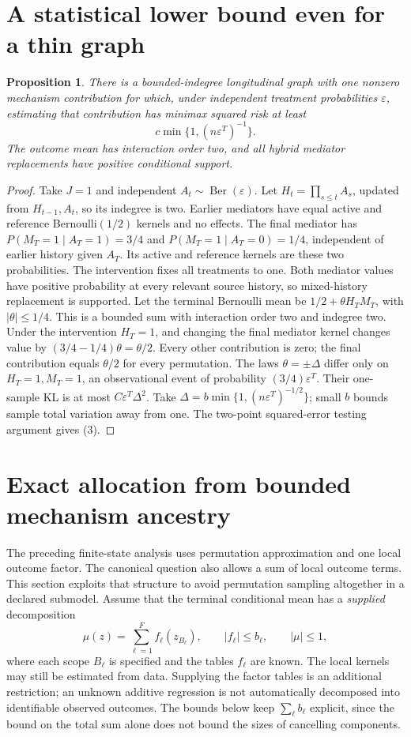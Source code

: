 \documentclass[11pt]{article}
\newtheorem{proposition}[theorem]{Proposition}
\theoremstyle{definition}
\begin{document}
\section*{A statistical lower bound even for a thin graph}
\begin{proposition}
There is a bounded-indegree longitudinal graph with one nonzero mechanism
contribution for which, under independent treatment probabilities
$\varepsilon$, estimating that contribution has minimax squared risk at least
\[
 c\min\{1,(n\varepsilon^T)^{-1}\}.                     \tag{3}
\]
The outcome mean has interaction order two, and all hybrid mediator
replacements have positive conditional support.
\end{proposition}
\begin{proof}
Take $J=1$ and independent $A_t\sim\operatorname{Ber}(\varepsilon)$.
Let $H_t=\prod_{s\le t}A_s$, updated from $H_{t-1},A_t$, so its indegree
is two. Earlier mediators have equal active and reference Bernoulli$(1/2)$
kernels and no effects. The final mediator has
$P(M_T=1\mid A_T=1)=3/4$ and
$P(M_T=1\mid A_T=0)=1/4$, independent of earlier history given $A_T$.
Its active and reference kernels are these two probabilities.
The intervention fixes all treatments to one. Both mediator values have
positive probability at every relevant source history, so mixed-history
replacement is supported. Let the terminal Bernoulli mean be
$1/2+\theta H_T M_T$, with $|\theta|\le1/4$.
This is a bounded sum with interaction order two and indegree two.
Under the intervention $H_T=1$, and changing the final mediator kernel
changes value by $(3/4-1/4)\theta=\theta/2$.
Every other contribution is zero; the final contribution equals $\theta/2$
for every permutation.
The laws $\theta=\pm\Delta$ differ only on $H_T=1,M_T=1$,
an observational event of probability $(3/4)\varepsilon^T$.
Their one-sample KL is at most $C\varepsilon^T\Delta^2$.
Take $\Delta=b\min\{1,(n\varepsilon^T)^{-1/2}\}$; small $b$ bounds
sample total variation away from one. The two-point squared-error testing
argument gives (3).
\end{proof}

\section*{Exact allocation from bounded mechanism ancestry}
The preceding finite-state analysis uses permutation approximation and one
local outcome factor. The canonical question also allows a sum of local
outcome terms. This section exploits that structure to avoid permutation
sampling altogether in a declared submodel. Assume that the terminal
conditional mean has a \emph{supplied} decomposition
\[
 \mu(z)=\sum_{\ell=1}^F f_\ell(z_{B_\ell}),\qquad
 |f_\ell|\le b_\ell,\qquad |\mu|\le1,                 \tag{4}
\]
where each scope $B_\ell$ is specified and the tables $f_\ell$ are known.
The local kernels may still be estimated from data. Supplying the factor
tables is an additional restriction; an unknown additive regression is
not automatically decomposed into identifiable observed outcomes.
The bounds below keep $\sum_\ell b_\ell$ explicit, since the bound on
the total sum alone does not bound the sizes of cancelling components.
\end{document}
